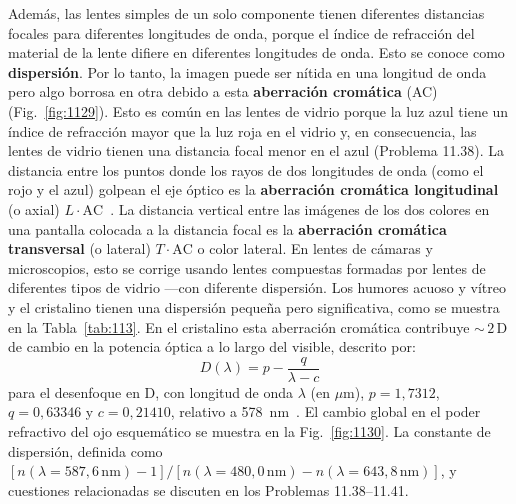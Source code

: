 \documentclass[12pt]{book}
\begin{document}
Además, las lentes simples de un solo componente tienen diferentes distancias focales para diferentes longitudes de onda, porque el índice de refracción del material de la lente difiere en diferentes longitudes de onda. Esto se conoce como \textbf{dispersión}. Por lo tanto, la imagen puede ser nítida en una longitud de onda pero algo borrosa en otra debido a esta \textbf{aberración cromática} (AC) (Fig.~\ref{fig:1129}). Esto es común en las lentes de vidrio porque la luz azul tiene un índice de refracción mayor que la luz roja en el vidrio y, en consecuencia, las lentes de vidrio tienen una distancia focal menor en el azul (Problema 11.38). La distancia entre los puntos donde los rayos de dos longitudes de onda (como el rojo y el azul) golpean el eje óptico es la \textbf{aberración cromática longitudinal} (o axial) $L\cdot\text{AC}$~\cite{2}. La distancia vertical entre las imágenes de los dos colores en una pantalla colocada a la distancia focal es la \textbf{aberración cromática transversal} (o lateral) $T\cdot\text{AC}$ o color lateral. En lentes de cámaras y microscopios, esto se corrige usando lentes compuestas formadas por lentes de diferentes tipos de vidrio ---con diferente dispersión. Los humores acuoso y vítreo y el cristalino tienen una dispersión pequeña pero significativa, como se muestra en la Tabla~\ref{tab:113}. En el cristalino esta aberración cromática contribuye ${\sim}\,2\,\text{D}$ de cambio en la potencia óptica a lo largo del visible, descrito por:
\begin{equation}
  D(\lambda) = p - \frac{q}{\lambda - c}
  \label{eq:11.69}
\end{equation}
para el desenfoque en D, con longitud de onda $\lambda$ (en $\mu$m), $p = 1{,}7312$, $q = 0{,}63346$ y $c = 0{,}21410$, relativo a 578~nm~\cite{58}. El cambio global en el poder refractivo del ojo esquemático se muestra en la Fig.~\ref{fig:1130}. La constante de dispersión, definida como $[n(\lambda = 587{,}6\,\text{nm}) - 1]/[n(\lambda = 480{,}0\,\text{nm}) - n(\lambda = 643{,}8\,\text{nm})]$, y cuestiones relacionadas se discuten en los Problemas 11.38--11.41.
\end{document}
